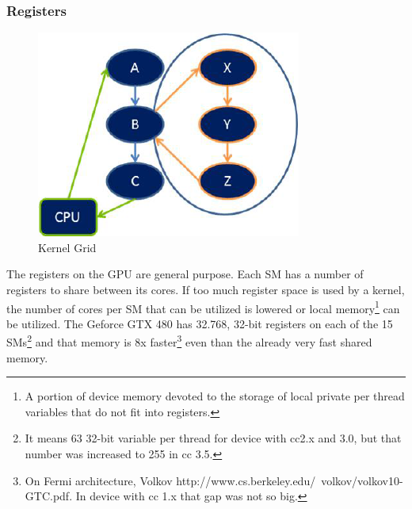 \subsubsection{Registers}
\begin{figure}
\caption{Kernel Grid}\label{dynamicParallelismSynch}
\includegraphics[scale=0.8]{./images/dynamicParallelismSynch}
\end{figure}
The registers on the GPU are general purpose. Each SM has a number of registers to share
between its cores. If too much register space is used by a kernel, the number of cores per SM that can
be utilized is lowered or local memory\footnote{A portion of device memory
devoted to the storage of local private per thread variables that do not fit
into registers.} can be utilized.
The Geforce GTX 480 has 32.768, 32-bit registers on each of the 15 SMs\footnote{It means 63
32-bit variable per thread for device with cc2.x and 3.0, but that number was
increased to 255 in cc 3.5.} and that memory is 8x faster\footnote{On
Fermi architecture, Volkov http://www.cs.berkeley.edu/~volkov/volkov10-GTC.pdf.
In device with cc 1.x that gap was not so big.} even than the already very
fast shared memory.



